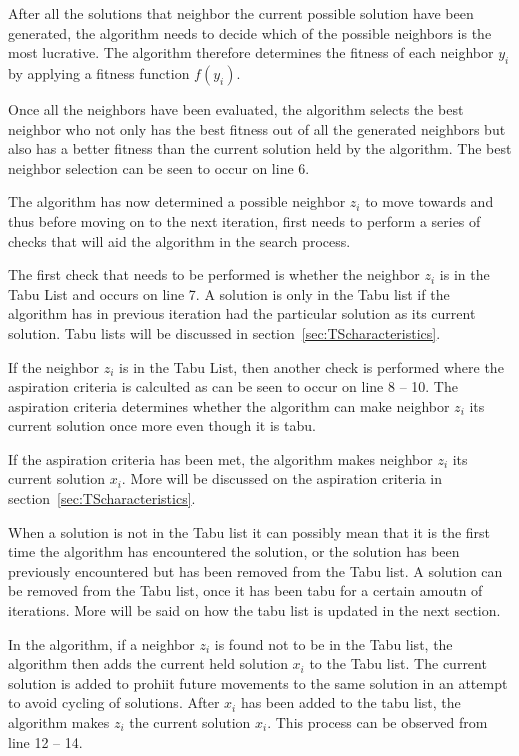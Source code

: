 After all the solutions that neighbor the current possible solution have been generated, the algorithm needs to decide which of the possible neighbors is the most lucrative. The algorithm therefore determines the fitness of each neighbor $y_i$ by applying a fitness function $f(y_i)$. 

Once all the neighbors have been evaluated, the algorithm selects the best neighbor who not only has the best fitness out of all the generated neighbors but also has a better fitness than the current solution held by the algorithm. The best neighbor selection can be seen to occur on line 6.

The algorithm has now determined a possible neighbor $z_i$ to move towards and thus before moving on to the next iteration, first needs to perform a series of checks that will aid the algorithm in the search process.

The first check that needs to be performed is whether the neighbor $z_i$ is in the Tabu List and occurs on line 7. A solution is only in the Tabu list if the algorithm has in previous iteration had the particular solution as its current solution. Tabu lists will be discussed in section~\ref{sec:TScharacteristics}.

If the neighbor $z_i$ is in the Tabu List, then another check is performed where the aspiration criteria is calculted as can be seen to occur on line 8 -- 10. The aspiration criteria determines whether the algorithm can make neighbor $z_i$ its current solution once more even though it is tabu. 

If the aspiration criteria has been met, the algorithm makes neighbor $z_i$ its current solution $x_i$. More will be discussed on the aspiration criteria in section~\ref{sec:TScharacteristics}.

When a solution is not in the Tabu list it can possibly mean that it is the first time the algorithm has encountered the solution, or the solution has been previously encountered but has been removed from the Tabu list. A solution can be removed from the Tabu list, once it has been tabu for a certain amoutn of iterations. More will be said on how the tabu list is updated in the next section.

In the algorithm, if a neighbor $z_i$ is found not to be in the Tabu list, the algorithm then adds the current held solution $x_i$ to the Tabu list. The current solution is added to prohiit future movements to the same solution in an attempt to avoid cycling of solutions. After $x_i$ has been added to the tabu list, the algorithm makes $z_i$ the current solution $x_i$. This process can be observed from line 12 -- 14.


